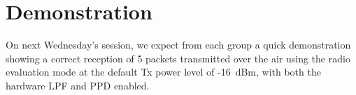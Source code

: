 \section{Demonstration}


On next Wednesday's session, we expect from each group a quick demonstration showing a correct reception of 5 packets transmitted over the air using the radio evaluation mode
at the default Tx power level of -16~dBm, with both the hardware LPF and PPD enabled.

\begin{comment}
\subsection{Report}

Please upload a report of \textbf{maximum} 2 pages with
\begin{enumerate}
    \item The output of the python testbench of the preamble detector (\texttt{3\_compare.py}), as well as your implementation of the Absolute-value norm.

    \item A summary of the resource usage (logic elements) and worst slack (setup) for the different compilation performed :
    \begin{enumerate}
        \item Initial design without register retiming and embedded multipliers.
        \item Initial design with register retiming and embedded multipliers.
        \item Final design with Absolute-value norm estimator.
    \end{enumerate}

    \item A breakdown of the resource usage for the final design including the Absolute-value norm. Focus mainly on logic cells/elements, for both the overall design (\texttt{lms7\_trx\_top}) and for the LimeSuite digital signal processing (\texttt{lms\_dsp)}. You can present it as a pie chart or an histogram. In both case, try to highlight the FIR (low-pass filter) and the preamble detector. You can find the required informations either in the \textit{Hierarchy} tab of the \textit{Project Navigator} view, or in the \textit{Analysis and Synthesis/Resource Utilization by Entity} tab of the compilation report.
\end{enumerate}
\end{comment}
